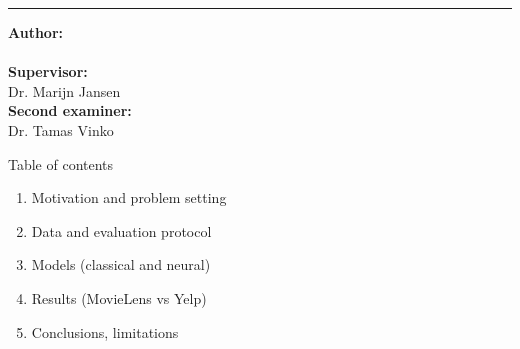 \documentclass[aspectratio=169,11pt]{beamer}
\newcommand\supervisor{Dr. Marijn Jansen}
\newcommand\secondexaminer{Dr. Tamas Vinko}
\begin{document}
\begin{frame}[plain]
\begin{flushleft}
\vspace{0.14cm}
{\rule{\textwidth}{0.6pt}}
\vspace{0.3cm}
\begin{minipage}{0.70\textwidth}
\scriptsize

\textbf{\textcolor{UCRred}{Author:}}\\[-0.05cm]
\insertauthor\\[0.10cm]

\textbf{\textcolor{UCRred}{Supervisor:}}\\[-0.05cm]
\supervisor\\[0.10cm]

\textbf{\textcolor{UCRred}{Second examiner:}}\\[-0.05cm]
\secondexaminer\\[0.12cm]

\insertdate
\end{minipage}

\end{flushleft}
\end{frame}



\begin{frame}{Table of contents}
\begin{enumerate}
  \item Motivation and problem setting
  \item Data and evaluation protocol
  \item Models (classical and neural)
  \item Results (MovieLens vs Yelp)
  \item Conclusions, limitations
\end{enumerate}
\end{frame}
\end{document}
